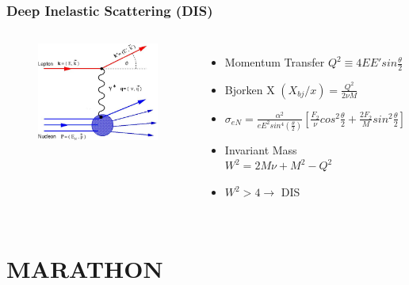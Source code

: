 \documentclass{beamer}
\begin{document}
\begin{frame}
\frametitle{Deep Inelastic Scattering (DIS)}
\begin{columns}[c] %
	
	\begin{figure}
		\includegraphics[width =5cm]{../images/DIS}
	\end{figure}
		
	
	\begin{itemize}
		\item Momentum Transfer $ Q^2 \equiv 4EE' sin \frac{\theta}{2} $
		\item Bjorken X $(X_{bj}/x) = \frac{Q^2}{2\nu M}$
		\item $\sigma_{eN} = \frac{\alpha^2}{eE^2sin^4(\frac{\theta}{2})} [\frac{F_2}{\nu}cos^2\frac{\theta}{2} + \frac{2F_2}{M}sin^2\frac{\theta}{2}] $
		\item Invariant Mass $W^2 = 2M\nu + M^2 - Q^2$
		\item $W^2 > 4 \rightarrow$ DIS
	\end{itemize}
	

	
\end{columns}
\end{frame}

\section[MARATHON]{MARATHON}
\end{document}
